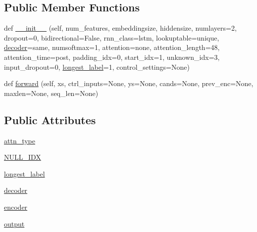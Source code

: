 \subsection*{Public Member Functions}
\begin{DoxyCompactItemize}
\item 
def \hyperlink{classcontrollable__seq2seq_1_1modules_1_1Seq2seq_a7e0be48d22af98a3102a3aba537f8c7d}{\+\_\+\+\_\+init\+\_\+\+\_\+} (self, num\+\_\+features, embeddingsize, hiddensize, numlayers=2, dropout=0, bidirectional=False, rnn\+\_\+class=\textquotesingle{}lstm\textquotesingle{}, lookuptable=\textquotesingle{}unique\textquotesingle{}, \hyperlink{classcontrollable__seq2seq_1_1modules_1_1Seq2seq_ae781db54c21b31be8b07e40505f6e60d}{decoder}=\textquotesingle{}same\textquotesingle{}, numsoftmax=1, attention=\textquotesingle{}none\textquotesingle{}, attention\+\_\+length=48, attention\+\_\+time=\textquotesingle{}post\textquotesingle{}, padding\+\_\+idx=0, start\+\_\+idx=1, unknown\+\_\+idx=3, input\+\_\+dropout=0, \hyperlink{classcontrollable__seq2seq_1_1modules_1_1Seq2seq_a644daa8d07b032b4787c42df2bdcca51}{longest\+\_\+label}=1, control\+\_\+settings=None)
\item 
def \hyperlink{classcontrollable__seq2seq_1_1modules_1_1Seq2seq_a024903e38d40e82ab471528d94afcd5c}{forward} (self, xs, ctrl\+\_\+inputs=None, ys=None, cands=None, prev\+\_\+enc=None, maxlen=None, seq\+\_\+len=None)
\end{DoxyCompactItemize}
\subsection*{Public Attributes}
\begin{DoxyCompactItemize}
\item 
\hyperlink{classcontrollable__seq2seq_1_1modules_1_1Seq2seq_aa7b91aeeac7dd5a42118ef75c61b02df}{attn\+\_\+type}
\item 
\hyperlink{classcontrollable__seq2seq_1_1modules_1_1Seq2seq_a53c2e1a8a5839edfe73c422f4c1b6ffe}{N\+U\+L\+L\+\_\+\+I\+DX}
\item 
\hyperlink{classcontrollable__seq2seq_1_1modules_1_1Seq2seq_a644daa8d07b032b4787c42df2bdcca51}{longest\+\_\+label}
\item 
\hyperlink{classcontrollable__seq2seq_1_1modules_1_1Seq2seq_ae781db54c21b31be8b07e40505f6e60d}{decoder}
\item 
\hyperlink{classcontrollable__seq2seq_1_1modules_1_1Seq2seq_ad071948b0df5e3a8605e3ad79f911188}{encoder}
\item 
\hyperlink{classcontrollable__seq2seq_1_1modules_1_1Seq2seq_a3225f2b7c92867cc6b894bef41856d92}{output}
\end{DoxyCompactItemize}
